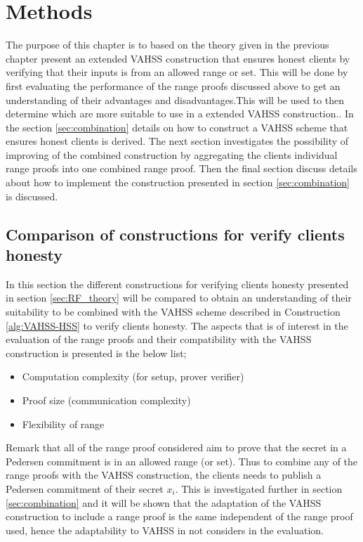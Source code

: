 \chapter{Methods}
\label{ch:Methods}

The purpose of this chapter is to based on the theory given in the previous chapter present an extended VAHSS construction that ensures honest clients by verifying that their inputs is from an allowed range or set. This will be done by first evaluating the performance of the range proofs discussed above to get an understanding of their advantages and disadvantages.This will be used to then determine which are more suitable to use in a extended VAHSS construction.. In the section \ref{sec:combination} details on how to construct a VAHSS scheme that ensures honest clients is derived. The next section investigates the possibility of  improving of the combined construction by aggregating the  clients individual range proofs into one combined range proof. Then the final section discuss details about how to implement the construction presented in section \ref{sec:combination} is discussed. 

\section{Comparison of constructions for verify clients honesty}
In this section the different constructions for verifying clients honesty presented in section \ref{sec:RF_theory} will be compared to obtain an understanding of their suitability to be combined with the VAHSS scheme described in Construction \ref{alg:VAHSS-HSS} to verify clients honesty. The aspects that  is of interest in the evaluation of the range proofs and their compatibility with the VAHSS construction is presented is the below list;
\begin{itemize}
    \item Computation complexity  (for setup, prover verifier)
    \item Proof size (communication complexity)
    \item Flexibility of range
\end{itemize}

Remark that all of the range proof considered aim to prove that the secret in a Pedersen commitment is in an allowed range (or set). Thus to combine any of the range proofs with the VAHSS construction, the clients needs to publish a Pedersen commitment of their secret $x_i$. This is investigated further in section \ref{sec:combination} and it will be shown that the adaptation of the VAHSS construction to include a range proof is the same independent of the range proof used, hence the adaptability to VAHSS in not considers in the evaluation.

